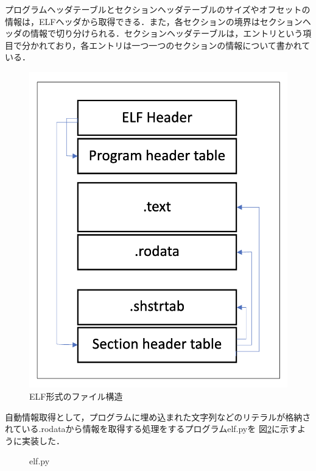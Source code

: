 \documentclass[dvipdfmx]{bta}
\begin{document}
プログラムヘッダテーブルとセクションヘッダテーブルのサイズやオフセットの情報は，ELFヘッダから取得できる．また，各セクションの境界はセクションヘッダの情報で切り分けられる．セクションヘッダテーブルは，エントリという項目で分かれており，各エントリは一つ一つのセクションの情報について書かれている．

\begin{figure}[htbp]
	\centering
 	\includegraphics[width=0.5\linewidth]{elf.png}
 	\caption{ELF形式のファイル構造}\label{fig:elf}
\end{figure}

自動情報取得として，プログラムに埋め込まれた文字列などのリテラルが格納されている.rodataから情報を取得する処理をするプログラムelf.pyを
図\ref{fig:elf.py}に示すように実装した．
\begin{figure}[htbp]
	
	\caption{elf.py}\label{fig:elf.py}
\end{figure}
\end{document}
